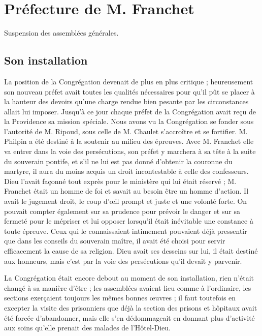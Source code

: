 \chapter{Préfecture de M. Franchet}
\begin{center}
Suspension des assemblées générales.
\end{center}

\section*{Son installation}
La position de la Congrégation devenait de plus en plus critique ; heureusement son nouveau préfet avait toutes les qualités nécessaires pour qu'il pût se placer à la hauteur des devoirs qu'une charge rendue bien pesante par les circonstances allait lui imposer. Jusqu'à ce jour chaque préfet de la Congrégation avait reçu de la Providence sa mission spéciale. Nous avons vu la Congrégation se fonder sous l'autorité de M. Ripoud, sous celle de M. Chaulet s'accroître et se fortifier. M. Philpin a été destiné à la soutenir au milieu des épreuves. Avec M. Franchet elle va entrer dans la voie des persécutions, son préfet y marchera à sa tête à la suite du souverain pontife, et s'il ne lui est pas donné d'obtenir la couronne du martyre, il aura du moins acquis un droit incontestable à celle des confesseurs. Dieu l'avait façonné tout exprès pour le ministère qui lui était réservé ; M. Franchet était un homme de foi et savait au besoin être un homme d'action. Il avait le jugement droit, le coup d'œil prompt et juste et une volonté forte. On pouvait compter également sur sa prudence pour prévoir le danger et sur sa fermeté pour le mépriser et lui opposer lorsqu'il était inévitable une constance à toute épreuve. Ceux qui le connaissaient intimement pouvaient déjà pressentir que dans les conseils du souverain maître, il avait été choisi pour servir efficacement la cause de sa religion. Dieu
avait ses desseins sur lui, il était destiné aux honneurs, mais c'est par la voie des persécutions qu'il devait y parvenir.

La Congrégation était encore debout au moment de son installation, rien n'était changé à sa manière d'être ; les assemblées avaient lieu comme à l'ordinaire, les sections exerçaient toujours les mêmes bonnes œuvres ; il faut toutefois en excepter la visite des prisonniers que déjà la section des prisons et hôpitaux avait été forcée d'abandonner, mais elle s'en dédommageait en donnant plus d'activité aux soins qu'elle prenait des malades de l'Hôtel-Dieu.

